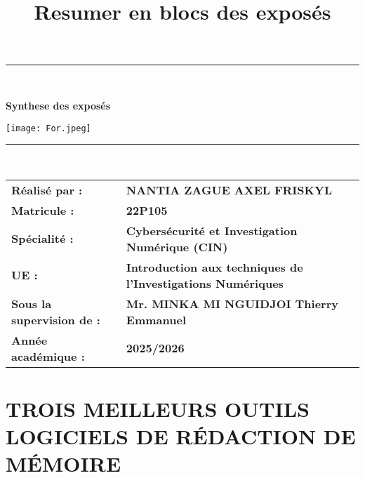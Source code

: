\documentclass[12pt, a4paper]{article}
\begin{document}
\begin{titlepage}
		\vspace{1.5cm}
		
		\noindent\rule{0.9\textwidth}{0.8pt}\\
		\vspace{0.5cm}
		
		\vspace{0.8cm}
		{\Large \textbf{Synthese des exposés}}\\
		\vspace{0.8cm}
		
		\texttt{[image: For.jpeg]}
		\noindent\rule{0.9\textwidth}{0.8pt}\\
		\vspace{1.5cm}
		
		\begin{tabular}{@{}>{\bfseries}l l@{}}
			\vspace{0.5cm}
			Réalisé par : & \textbf{NANTIA ZAGUE AXEL FRISKYL} \\
			\vspace{0.5cm}
			Matricule : & \textbf{22P105} \\
			\vspace{0.5cm}
			Spécialité : & \textbf{Cybersécurité et Investigation Numérique (CIN)} \\
			\vspace{0.5cm}
			UE : & \textbf{Introduction aux techniques de l'Investigations Numériques} \\
			\vspace{0.5cm}
			Sous la supervision de : & \textbf{Mr. MINKA MI NGUIDJOI Thierry Emmanuel} \\
			\vspace{0.5cm}
			Année académique : & \textbf{2025/2026} \\
		\end{tabular}
		
	\end{titlepage}
	
	\thispagestyle{empty}
	\newpage
	
	
	\title{\textbf{Resumer en blocs des exposés}}
	\author{}
	\date{}
	
	
	
	\maketitle
		
		\section{TROIS MEILLEURS OUTILS LOGICIELS DE RÉDACTION DE MÉMOIRE}
		
\end{document}
